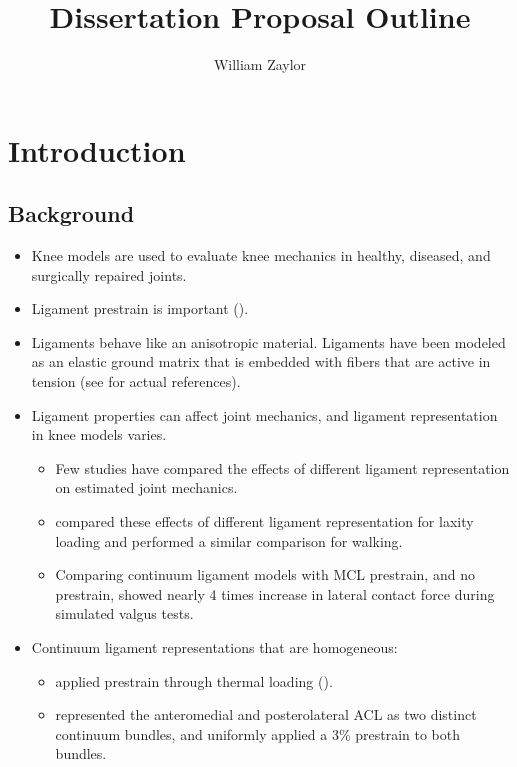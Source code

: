 \documentclass{article}
\author{William Zaylor}
\title{Dissertation Proposal Outline}
\begin{document}
\maketitle

\section{Introduction}
\subsection{Background}
\begin{itemize}
    \item Knee models are used to evaluate knee mechanics in healthy, diseased, and surgically repaired joints.
    \item Ligament prestrain is important ().
    \item Ligaments behave like an anisotropic material. Ligaments have been modeled as an elastic ground matrix that is embedded with fibers that are active in tension (see \citep{beidokhti_influence_2017} for actual references).
    \item Ligament properties can affect joint mechanics, and ligament representation in knee models varies.
    \begin{itemize}
        \item Few studies have compared the effects of different ligament representation on estimated joint mechanics.
        \item \cite{beidokhti_influence_2017} compared these effects of different ligament representation for laxity loading and \cite{orozco_effect_2018} performed a similar comparison for walking.
        \item Comparing continuum ligament models with MCL prestrain, and no prestrain, \cite{maas_general_2016} showed nearly 4 times increase in lateral contact force during simulated valgus tests.
    \end{itemize}
    \item Continuum ligament representations that are homogeneous:
    \begin{itemize}
        \item \cite{beidokhti_influence_2017} applied prestrain through thermal loading ().
        \item \cite{song_three-dimensional_2004} represented the anteromedial and posterolateral ACL as two distinct continuum bundles, and uniformly applied a 3\% prestrain to both bundles.

\end{itemize}
\end{itemize}
\end{document}
